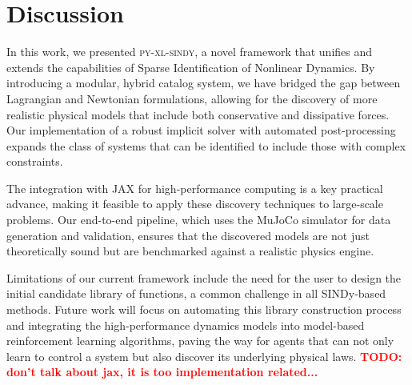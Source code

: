 \documentclass[12pt]{article}
\newcommand{\frameworkname}{\textsc{py-xl-sindy}}
\newcommand{\TODO}[1]{\textbf{\textcolor{red}{\Large TODO: \normalsize #1}}}
\begin{document}
\section*{Discussion}
In this work, we presented \frameworkname, a novel framework that unifies and extends the capabilities of Sparse Identification of Nonlinear Dynamics. By introducing a modular, hybrid catalog system, we have bridged the gap between Lagrangian and Newtonian formulations, allowing for the discovery of more realistic physical models that include both conservative and dissipative forces. Our implementation of a robust implicit solver with automated post-processing expands the class of systems that can be identified to include those with complex constraints.

The integration with JAX for high-performance computing is a key practical advance, making it feasible to apply these discovery techniques to large-scale problems. Our end-to-end pipeline, which uses the MuJoCo simulator for data generation and validation, ensures that the discovered models are not just theoretically sound but are benchmarked against a realistic physics engine.

Limitations of our current framework include the need for the user to design the initial candidate library of functions, a common challenge in all SINDy-based methods. Future work will focus on automating this library construction process and integrating the high-performance dynamics models into model-based reinforcement learning algorithms, paving the way for agents that can not only learn to control a system but also discover its underlying physical laws.
\TODO{don't talk about jax, it is too implementation related...}

\newpage

\end{document}
